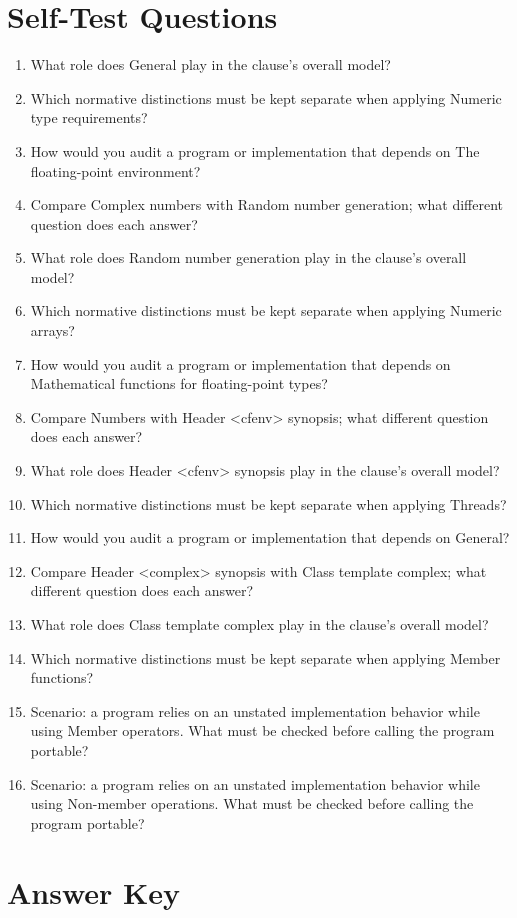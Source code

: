 \documentclass[11pt,letterpaper]{article}
\begin{document}
\section{Self-Test Questions}
\begin{enumerate}
\item What role does General play in the clause's overall model?
\item Which normative distinctions must be kept separate when applying Numeric type requirements?
\item How would you audit a program or implementation that depends on The floating-point environment?
\item Compare Complex numbers with Random number generation; what different question does each answer?
\item What role does Random number generation play in the clause's overall model?
\item Which normative distinctions must be kept separate when applying Numeric arrays?
\item How would you audit a program or implementation that depends on Mathematical functions for floating-point types?
\item Compare Numbers with Header <cfenv> synopsis; what different question does each answer?
\item What role does Header <cfenv> synopsis play in the clause's overall model?
\item Which normative distinctions must be kept separate when applying Threads?
\item How would you audit a program or implementation that depends on General?
\item Compare Header <complex> synopsis with Class template complex; what different question does each answer?
\item What role does Class template complex play in the clause's overall model?
\item Which normative distinctions must be kept separate when applying Member functions?
\item Scenario: a program relies on an unstated implementation behavior while using Member operators. What must be checked before calling the program portable?
\item Scenario: a program relies on an unstated implementation behavior while using Non-member operations. What must be checked before calling the program portable?
\end{enumerate}
\clearpage\section{Answer Key}
\end{document}
